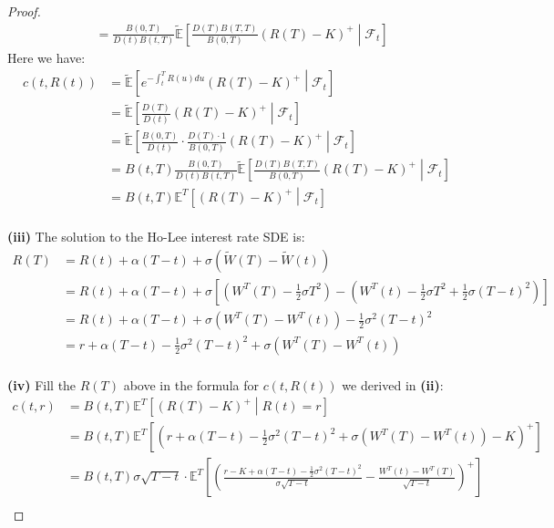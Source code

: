 \documentclass[a4paper, 10pt]{article}
\theoremstyle{definition}
\theoremstyle{hSol}
\begin{document}
\begin{proof}
\begin{equation}
\begin{split}
    &=  \frac{B(0,T)}{D(t)B(t,T)} \widetilde{\mathbb{E}}\left[ \frac{D(T)B(T,T)}{B(0,T)} (R(T)-K)^+\middle|\mathcal{F}_t\right]
  \end{split}
\end{equation}
Here we have:
\begin{equation}
  \begin{split}
    c(t,R(t)) &= \widetilde{\mathbb{E}}\left[e^{-\int_t^T R(u)du}(R(T)-K)^+\middle|\mathcal{F}_t\right]\\
    &= \widetilde{\mathbb{E}}\left[\frac{D(T)}{D(t)}(R(T)-K)^+\middle|\mathcal{F}_t\right] \\
    &= \widetilde{\mathbb{E}}\left[\frac{B(0,T)}{D(t)}\cdot\frac{D(T)\cdot 1}{B(0,T)}(R(T)-K)^+\middle|\mathcal{F}_t\right] \\
    &= B(t,T)\frac{B(0,T)}{D(t)B(t,T)} \widetilde{\mathbb{E}}\left[\frac{D(T)B(T,T)}{B(0,T)}(R(T)-K)^+\middle|\mathcal{F}_t\right] \\
    &= B(t,T)\mathbb{E}^T\left[(R(T)-K)^+\middle|\mathcal{F}_t\right]
  \end{split}
\end{equation}
\\
\textbf{(iii)} The solution to the Ho-Lee interest rate SDE is:
\begin{equation}
  \begin{split}
    R(T) &= R(t) + \alpha (T-t) +\sigma (\widetilde{W}(T)-\widetilde{W}(t)) \\
    &= R(t) + \alpha (T-t) +\sigma \left[\left(W^T(T)- \frac{1}{2}\sigma T^2 \right)  -\left(W^T(t)- \frac{1}{2}\sigma T^2 + \frac{1}{2}\sigma (T-t)^2\right)\right] \\
    &=R(t) + \alpha (T-t) +\sigma (W^T(T)-W^T(t))- \frac{1}{2}\sigma^2(T-t)^2\\
    &= r + \alpha (T-t) - \frac{1}{2}\sigma^2(T-t)^2 +\sigma (W^T(T)-W^T(t))
  \end{split}
\end{equation}
~\\
\textbf{(iv)} Fill the $R(T)$ above in the formula for $c(t,R(t))$ we derived in \textbf{(ii)}:
\begin{equation}
  \begin{split}
    c(t,r) &= B(t,T)\mathbb{E}^T\left[(R(T)-K)^+\middle|R(t)=r\right] \\
    & = B(t,T)\mathbb{E}^T\left[\left(r + \alpha (T-t) - \frac{1}{2}\sigma^2(T-t)^2 +\sigma (W^T(T)-W^T(t))-K\right)^+\right] \\
    &= B(t,T)\sigma \sqrt{T-t}\cdot \mathbb{E}^T\left[\left(\frac{r - K+ \alpha (T-t) - \frac{1}{2}\sigma^2(T-t)^2}{\sigma \sqrt{T-t}} -  \frac{W^T(t)-W^T(T)}{\sqrt{T-t}}\right)^+\right]\\

\end{split}
\end{equation}
\end{proof}
\end{document}
